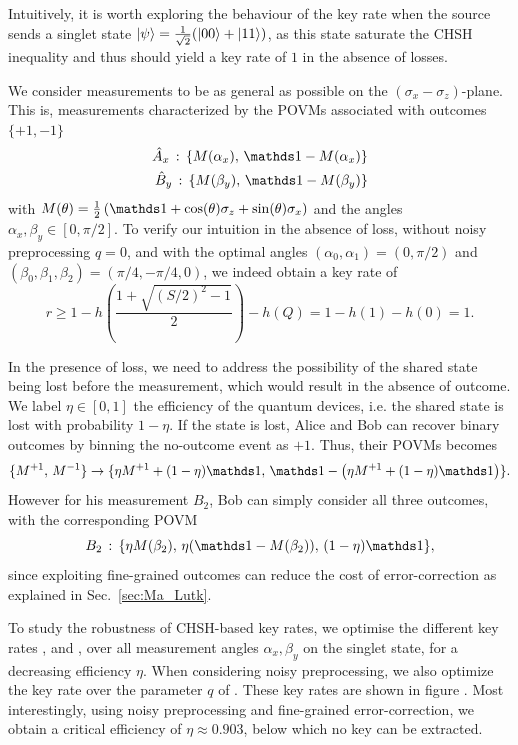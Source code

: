 \medbreak

Intuitively, it is worth exploring the behaviour of the key rate when the source sends a singlet state $\ket{\psi}=\frac{1}{\sqrt{2}}(\ket{00}+\ket{11})$, as this state saturate the CHSH inequality and thus should yield a key rate of $1$ in the absence of losses.

We consider measurements to be as general as possible on the $(\sigma_x-\sigma_z)$-plane. This is, measurements characterized by the POVMs associated with outcomes $\{+1,-1\}$
\begin{equation}
	\begin{split}
		\hat{A}_x\,:\, \{M(\alpha_x),\, \id-M(\alpha_x)\} \\
		\hat{B}_y\,:\, \{M(\beta_y),\, \id-M(\beta_y)\}
	\end{split}	
\end{equation}
with $M(\theta) = \frac{1}{2}\left(\id + \cos(\theta)\sigma_z + \sin(\theta)\sigma_x \right)$ and the angles $\alpha_x,\beta_y\in[0,\pi/2]$.
To verify our intuition in the absence of loss, without noisy preprocessing $q=0$, and with the optimal angles $(\alpha_0,\alpha_1)=(0,\pi/2)$ and $(\beta_0,\beta_1,\beta_2)=(\pi/4,-\pi/4,0)$, we indeed obtain a key rate of
\begin{equation}
	r \geq 1-h\left(\frac{1+\sqrt{(S/2)^2-1}}{2}\right)-h(Q) = 1 - h(1) - h(0) = 1.
\end{equation}

In the presence of loss, we need to address the possibility of the shared state being lost before the measurement, which would result in the absence of outcome.
We label $\eta\in[0,1]$ the efficiency of the quantum devices, i.e. the shared state is lost with probability $1-\eta$.
If the state is lost, Alice and Bob can recover binary outcomes by binning the no-outcome event as $+1$.
Thus, their POVMs becomes
\begin{equation}
	\{M^{+1},\,M^{-1}\} \rightarrow \{\eta M^{+1}+(1-\eta) \id,\, \id-\left(\eta M^{+1}+(1-\eta) \id\right)\}.
\end{equation}
However for his measurement $B_2$, Bob can simply consider all three outcomes, with the corresponding POVM
\begin{equation}
	B_2\, : \, \{\eta M(\beta_2),\, \eta (\id-M(\beta_2)),\, (1-\eta) \id \},
\end{equation}
since exploiting fine-grained outcomes can reduce the cost of error-correction as explained in Sec.~\ref{sec:Ma_Lutk}.

To study the robustness of CHSH-based key rates, we optimise the different key rates ,  and , over all measurement angles $\alpha_x,\beta_y$ on the singlet state, for a decreasing efficiency $\eta$. 
When considering noisy preprocessing, we also optimize the key rate over the parameter $q$ of .
These key rates are shown in figure . 
Most interestingly, using noisy preprocessing and fine-grained error-correction, we obtain a critical efficiency of $\eta \approx 0.903$, below which no key can be extracted.

